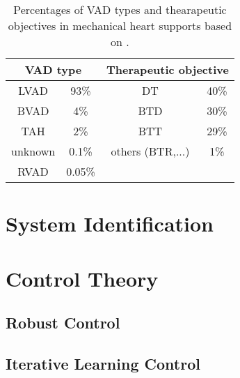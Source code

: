 \begin{table}
  \centering
  \begin{tabular}{cc|cc}
    \toprule
    \multicolumn{2}{c|}{VAD type} &
    \multicolumn{2}{c}{Therapeutic objective} \\
    \midrule
    LVAD & 93\% & DT & 40\%\\
    BVAD & 4\% & BTD & 30\%\\
    TAH & 2\% & BTT & 29\%\\
    unknown & 0.1\% & others (BTR,...) & 1\%\\
    RVAD & 0.05\% & &\\
    \bottomrule
\end{tabular}
  \caption{Percentages of VAD types and thearapeutic objectives in mechanical heart supports based on \cite{VAD7}.}
  \label{tab:Table2}
\end{table}

\section{System Identification}

\section{Control Theory}
\subsection{Robust Control}
\subsection{Iterative Learning Control}
